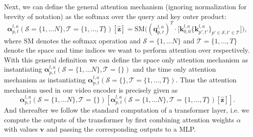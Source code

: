Next, we can define the general attention mechanism (ignoring normalization for brevity of notation) as the softmax over the query and key outer product:
\begin{equation}
    \mathbf{\alpha}^{l,a}_{p,t} (\mathcal{S} = \lbrace1, \dots N \rbrace, \mathcal{T} = \lbrace 1, \dots, T \rbrace) [\hat{\mathbf{z}}] = \text{SM}\Big( (\mathbf{q}^{l, a}_{p, t})^T \cdot \big[ \mathbf{k}^{l, a}_{0, 0} \lbrace \mathbf{k}^{l, a}_{p', t'} \rbrace_{p' \in \mathcal{S}, t' \in \mathcal{T}} \big]\Big),
\end{equation}
where $\text{SM}$ denotes the softmax operation and $\mathcal{S} = \lbrace1, \dots N \rbrace$ and $\mathcal{T} = \lbrace 1, \dots, T \rbrace$ denote the space and time indices we want to perform attention over respectively.
With this general definition we can define the space only attention mechanism as instantiating $\mathbf{\alpha}^{l,a}_{p,t} (\mathcal{S} = \lbrace 1, \dots N \rbrace, \mathcal{T} = \lbrace \rbrace)$ and the time only attention mechanism as instantiating $\mathbf{\alpha}^{l,a}_{p,t} (\mathcal{S} = \lbrace \rbrace, \mathcal{T} = \lbrace 1, \dots, T \rbrace)$.
Thus the attention mechanism used in our video encoder is precisely given as
\begin{equation}
    \mathbf{\alpha}^{l,a}_{p,t} (\mathcal{S} = \lbrace 1, \dots N \rbrace, \mathcal{T} = \lbrace \rbrace) [ \mathbf{\alpha}^{l,a}_{p,t} (\mathcal{S} = \lbrace1, \dots N \rbrace, \mathcal{T} = \lbrace 1, \dots, T \rbrace)[\hat{\mathbf{z}}]].
\end{equation}
And thereafter we follow the standard computation of a transformer layer, i.e. we compute the outputs of the transformer by first combining attention weights $\alpha$ with values $\mathbf{v}$ and passing the corresponding outputs to a MLP.
